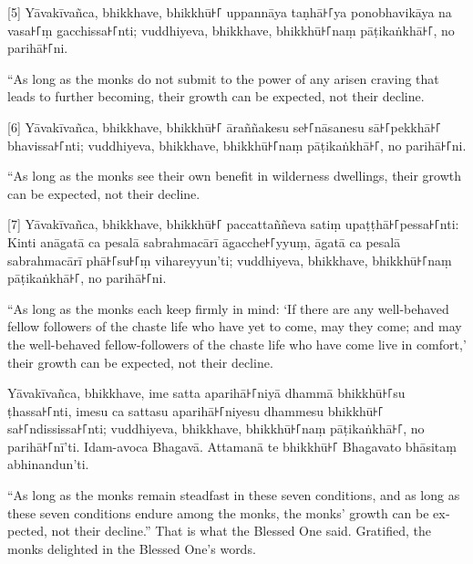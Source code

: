 [5] Yāvakīvañca, bhikkhave, bhikkhū꜔꜒ uppannāya taṇhā꜔꜒ya ponobhavikāya na vasa꜔꜒ṃ
gacchissa꜔꜒nti; vuddhiyeva, bhikkhave, bhikkhū꜔꜒naṃ pāṭikaṅkhā꜔꜒, no parihā꜔꜒ni.

\begin{english}
  “As long as the monks do not submit to the power of any arisen craving that
  leads to further becoming, their growth can be expected, not their decline.
\end{english}

[6] Yāvakīvañca, bhikkhave, bhikkhū꜔꜒ āraññakesu se꜔꜒nāsanesu sā꜔꜒pekkhā꜔꜒ bhavissa꜔꜒nti;
vuddhiyeva, bhikkhave, bhikkhū꜔꜒naṃ pāṭikaṅkhā꜔꜒, no parihā꜔꜒ni.

\begin{english}
  “As long as the monks see their own benefit in wilderness dwellings, their
  growth can be expected, not their decline.
\end{english}

[7] Yāvakīvañca, bhikkhave, bhikkhū꜔꜒ paccattaññeva satiṃ upaṭṭhā꜔꜒pessa꜔꜒nti: Kinti
anāgatā ca pesalā sabrahmacārī āgacche꜔꜒yyuṃ, āgatā ca pesalā sabrahmacārī phā꜔꜒su꜔꜒ṃ
vihareyyun'ti; vuddhiyeva, bhikkhave, bhikkhū꜔꜒naṃ pāṭikaṅkhā꜔꜒, no parihā꜔꜒ni.

\begin{english}
  “As long as the monks each keep firmly in mind: `If there are any well-behaved
  fellow followers of the chaste life who have yet to come, may they come; and
  may the well-behaved fellow-followers of the chaste life who have come live in
  comfort,' their growth can be expected, not their decline.
\end{english}

Yāvakīvañca, bhikkhave, ime satta aparihā꜔꜒niyā dhammā bhikkhū꜔꜒su ṭhassa꜔꜒nti, imesu
ca sattasu aparihā꜔꜒niyesu dhammesu bhikkhū꜔꜒ sa꜔꜒ndississa꜔꜒nti; vuddhiyeva, bhikkhave,
bhikkhū꜔꜒naṃ pāṭikaṅkhā꜔꜒, no parihā꜔꜒nī'ti. Idam-avoca Bhagavā. Attamanā te bhikkhū꜔꜒
Bhagavato bhāsitaṃ abhinandun'ti.

\begin{english}
  “As long as the monks remain steadfast in these seven conditions, and as long
  as these seven conditions endure among the monks, the monks' growth can be
  expected, not their decline.” That is what the Blessed One said. Gratified,
  the monks delighted in the Blessed One's words.
\end{english}

